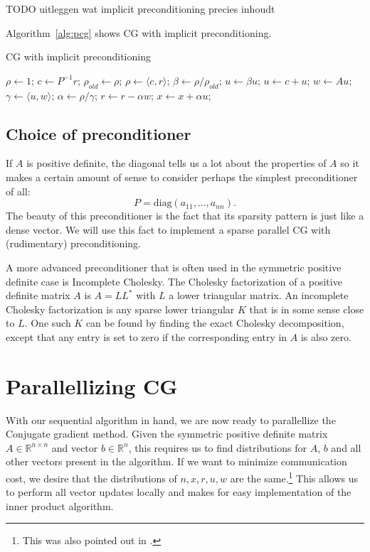 \documentclass[11pt]{amsart}
\theoremstyle{definition}
\newcommand{\R}{\mathbb{R}}
\begin{document}
TODO uitleggen wat implicit preconditioning precies inhoudt

Algorithm~\ref{alg:pcg} shows CG with implicit preconditioning. \cite[Lect.~10]{sleij}
\begin{algorithm}
  \caption{CG with implicit preconditioning \cite[Lect.~10]{sleij}}
  \label{alg:pcg}
  \begin{algorithmic}
    \State $\rho \gets 1$;
      \State $c \gets P^{-1} r$; 
      \State $\rho_{old} \gets \rho$;
      \State $\rho \gets \langle c, r \rangle$;
      \State
        \State $\beta \gets \rho/\rho_{old}$;
        \State $u \gets \beta u$;
      \EndIf
      \State
      \State $u \gets c + u$;
      \State $w \gets Au$;
      \State $\gamma \gets \langle u, w \rangle$;
      \State $\alpha \gets \rho/\gamma$;
      \State $r \gets r - \alpha w$;
      \State $x \gets x + \alpha u$;
    \EndWhile
  \end{algorithmic}
\end{algorithm}

\subsection{Choice of preconditioner}
If $A$ is positive definite, the diagonal tells us a lot about the properties of $A$ so it makes a certain amount of sense to consider perhaps the simplest preconditioner of all:
\[
  P = \text{diag}(a_{11}, \ldots, a_{nn}).
\]
The beauty of this preconditioner is the fact that its sparsity pattern is just like a dense vector. We will use this fact to implement a sparse parallel CG with (rudimentary) preconditioning.

A more advanced preconditioner that is often used in the symmetric positive definite case is Incomplete Cholesky.  The Cholesky factorization of a positive definite matrix $A$ is $A = LL^*$ with $L$ a lower triangular matrix. An incomplete Cholesky factorization is any sparse lower triangular $K$ that is in some sense close to $L$. One such $K$ can be found by finding the exact Cholesky decomposition, except that any entry is set to zero if the corresponding entry in $A$ is also zero. \cite[\S11.5.8]{golub}

\section{Parallellizing CG}
With our sequential algorithm in hand, we are now ready to parallellize the Conjugate gradient method. Given the symmetric positive definite matrix $A \in \R^{n \times n}$ and vector $b \in \R^n$, this requires us to find distributions for $A$, $b$ and all other vectors present in the algorithm. If we want to minimize communication cost, we desire that the distributions of $n, x, r, u, w$ are the same.\footnote{This was also pointed out in \cite[p.~174]{biss04}.} This allows us to perform all vector updates locally and makes for easy implementation of the inner product algorithm.
\end{document}
